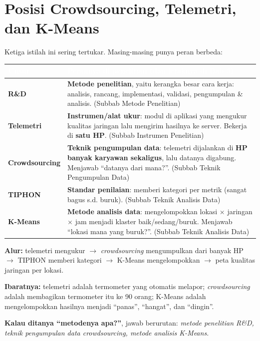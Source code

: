 \documentclass[11pt,a4paper]{article}
\newcommand{\term}[1]{\cellcolor{band}\textbf{#1}}
\newcommand{\kepala}[2]{\rowcolor{head}\textcolor{white}{\textbf{#1}} & \textcolor{white}{\textbf{#2}}\\ \midrule}
\begin{document}
\section{Posisi Crowdsourcing, Telemetri, dan K-Means}
Ketiga istilah ini sering tertukar. Masing-masing punya peran berbeda:
\begin{longtable}{KV}
\toprule
\kepala{Unsur}{Perannya di penelitian (dan letaknya di Bab 3)}
\endhead
\term{R\&D} & \textbf{Metode penelitian}, yaitu kerangka besar cara kerja: analisis, rancang, implementasi, validasi, pengumpulan \& analisis. (Subbab Metode Penelitian) \\
\term{Telemetri} & \textbf{Instrumen/alat ukur}: modul di aplikasi yang mengukur kualitas jaringan lalu mengirim hasilnya ke server. Bekerja di \textbf{satu HP}. (Subbab Instrumen Penelitian) \\
\term{Crowdsourcing} & \textbf{Teknik pengumpulan data}: telemetri dijalankan di \textbf{HP banyak karyawan sekaligus}, lalu datanya digabung. Menjawab ``datanya dari mana?''. (Subbab Teknik Pengumpulan Data) \\
\term{TIPHON} & \textbf{Standar penilaian}: memberi kategori per metrik (sangat bagus s.d. buruk). (Subbab Teknik Analisis Data) \\
\term{K-Means} & \textbf{Metode analisis data}: mengelompokkan lokasi $\times$ jaringan $\times$ jam menjadi klaster baik/sedang/buruk. Menjawab ``lokasi mana yang buruk?''. (Subbab Teknik Analisis Data) \\
\bottomrule
\end{longtable}
\textbf{Alur:} telemetri mengukur $\rightarrow$ \textit{crowdsourcing} mengumpulkan dari banyak HP $\rightarrow$ TIPHON memberi kategori $\rightarrow$ K-Means mengelompokkan $\rightarrow$ peta kualitas jaringan per lokasi.

\textbf{Ibaratnya:} telemetri adalah termometer yang otomatis melapor; \textit{crowdsourcing} adalah membagikan termometer itu ke 90 orang; K-Means adalah mengelompokkan hasilnya menjadi ``panas'', ``hangat'', dan ``dingin''.

\textbf{Kalau ditanya ``metodenya apa?''}, jawab berurutan: \textit{metode penelitian R\&D, teknik pengumpulan data crowdsourcing, metode analisis K-Means.}

\end{document}
